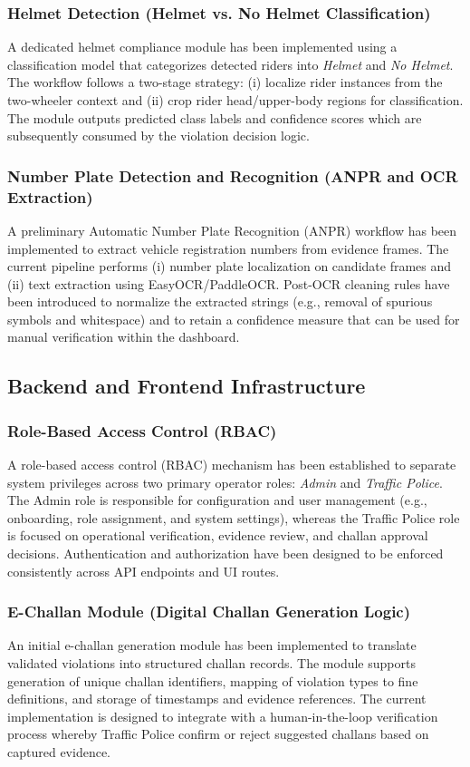 \subsubsection{Helmet Detection (Helmet vs. No Helmet Classification)}
A dedicated helmet compliance module has been implemented using a classification model that categorizes detected riders into \textit{Helmet} and \textit{No Helmet}. The workflow follows a two-stage strategy: (i) localize rider instances from the two-wheeler context and (ii) crop rider head/upper-body regions for classification. The module outputs predicted class labels and confidence scores which are subsequently consumed by the violation decision logic.

\subsubsection{Number Plate Detection and Recognition (ANPR and OCR Extraction)}
A preliminary Automatic Number Plate Recognition (ANPR) workflow has been implemented to extract vehicle registration numbers from evidence frames. The current pipeline performs (i) number plate localization on candidate frames and (ii) text extraction using EasyOCR/PaddleOCR. Post-OCR cleaning rules have been introduced to normalize the extracted strings (e.g., removal of spurious symbols and whitespace) and to retain a confidence measure that can be used for manual verification within the dashboard.

\subsection{Backend and Frontend Infrastructure}
\label{subsec:backend-frontend}

\subsubsection{Role-Based Access Control (RBAC)}
A role-based access control (RBAC) mechanism has been established to separate system privileges across two primary operator roles: \textit{Admin} and \textit{Traffic Police}. The Admin role is responsible for configuration and user management (e.g., onboarding, role assignment, and system settings), whereas the Traffic Police role is focused on operational verification, evidence review, and challan approval decisions. Authentication and authorization have been designed to be enforced consistently across API endpoints and UI routes.

\subsubsection{E-Challan Module (Digital Challan Generation Logic)}
An initial e-challan generation module has been implemented to translate validated violations into structured challan records. The module supports generation of unique challan identifiers, mapping of violation types to fine definitions, and storage of timestamps and evidence references. The current implementation is designed to integrate with a human-in-the-loop verification process whereby Traffic Police confirm or reject suggested challans based on captured evidence.


